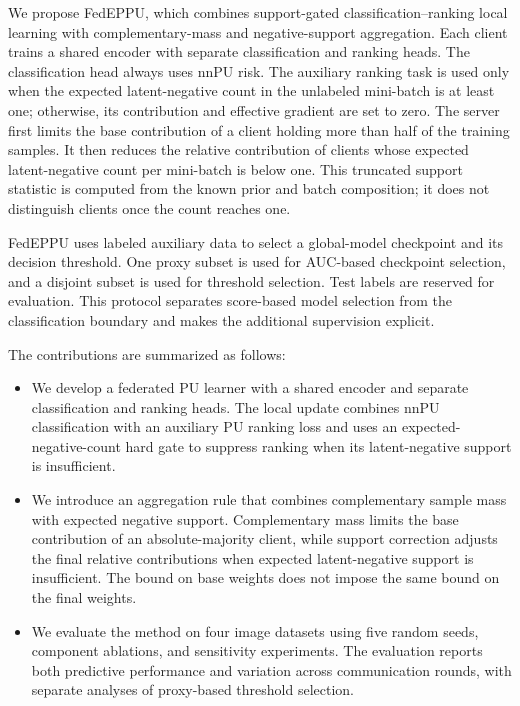 \documentclass[lettersize,journal]{IEEEtran}
\begin{document}
We propose FedEPPU, which combines support-gated classification--ranking local learning with complementary-mass and negative-support aggregation. Each client trains a shared encoder with separate classification and ranking heads. The classification head always uses nnPU risk. The auxiliary ranking task is used only when the expected latent-negative count in the unlabeled mini-batch is at least one; otherwise, its contribution and effective gradient are set to zero. The server first limits the base contribution of a client holding more than half of the training samples. It then reduces the relative contribution of clients whose expected latent-negative count per mini-batch is below one. This truncated support statistic is computed from the known prior and batch composition; it does not distinguish clients once the count reaches one.

FedEPPU uses labeled auxiliary data to select a global-model checkpoint and its decision threshold. One proxy subset is used for AUC-based checkpoint selection, and a disjoint subset is used for threshold selection. Test labels are reserved for evaluation. This protocol separates score-based model selection from the classification boundary and makes the additional supervision explicit.

The contributions are summarized as follows:
\begin{itemize}
    \item We develop a federated PU learner with a shared encoder and separate classification and ranking heads. The local update combines nnPU classification with an auxiliary PU ranking loss and uses an expected-negative-count hard gate to suppress ranking when its latent-negative support is insufficient.
    \item We introduce an aggregation rule that combines complementary sample mass with expected negative support. Complementary mass limits the base contribution of an absolute-majority client, while support correction adjusts the final relative contributions when expected latent-negative support is insufficient. The bound on base weights does not impose the same bound on the final weights.
    \item We evaluate the method on four image datasets using five random seeds, component ablations, and sensitivity experiments. The evaluation reports both predictive performance and variation across communication rounds, with separate analyses of proxy-based threshold selection.
\end{itemize}
\end{document}
